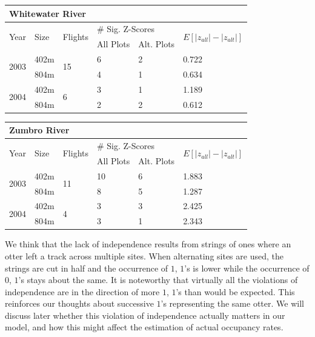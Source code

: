 \documentclass[12pt]{article}
\begin{document}
    \begin{center}
    \begin{tabular}{|l|l|l|l|l|l|}
        \hline
        \multicolumn{6}{|l|}{\textbf{Whitewater River}} \\
        \hline
        \multirow{2}{*}{Year} & \multirow{2}{*}{Size} & \multirow{2}{*}{Flights}
        & \multicolumn{2}{|l|}{\# Sig. Z-Scores} &
        \multirow{2}{*}{\(E[|z_{all}|-|z_{alt}|]\)} \\
        \cline{4-5}
        & & & All Plots & Alt. Plots & \\
        \hline
        \multirow{2}{*}{2003} & 402m & \multirow{2}{*}{15} & 6 & 2 & 0.722 \\
        \cline{2-2} \cline{4-6}
        & 804m & & 4 & 1 & 0.634 \\
        \hline
        \multirow{2}{*}{2004} & 402m & \multirow{2}{*}{6} & 3 & 1 & 1.189 \\
        \cline{2-2} \cline{4-6}
        & 804m & & 2 & 2 & 0.612 \\
        \hline
    \end{tabular}
    \end{center}

    \begin{center}
    \begin{tabular}{|l|l|l|l|l|l|}
        \hline
        \multicolumn{6}{|l|}{\textbf{Zumbro River}} \\
        \hline
        \multirow{2}{*}{Year} & \multirow{2}{*}{Size} & \multirow{2}{*}{Flights}
        & \multicolumn{2}{|l|}{\# Sig. Z-Scores} &
        \multirow{2}{*}{\(E[|z_{all}|-|z_{alt}|]\)} \\
        \cline{4-5}
        & & & All Plots & Alt. Plots & \\
        \hline
        \multirow{2}{*}{2003} & 402m & \multirow{2}{*}{11} & 10 & 6 & 1.883 \\
        \cline{2-2} \cline{4-6}
        & 804m & & 8 & 5 & 1.287 \\
        \hline
        \multirow{2}{*}{2004} & 402m & \multirow{2}{*}{4} & 3 & 3 & 2.425 \\
        \cline{2-2} \cline{4-6}
        & 804m & & 3 & 1 & 2.343 \\
        \hline
    \end{tabular}
    \end{center}

    We think that the lack of independence results from strings of ones where an
    otter left a track across multiple sites. When alternating sites are used,
    the strings are cut in half and the occurrence of \(1\), \(1\)'s is lower
    while the occurrence of \(0\), \(1\)'s stays about the same. It is
    noteworthy that virtually all the violations of independence are in the
    direction of more \(1\), \(1\)'s than would be expected. This reinforces our
    thoughts about successive \(1\)'s representing the same otter. We will
    discuss later whether this violation of independence actually matters in our
    model, and how this might affect the estimation of actual occupancy rates.
\end{document}
